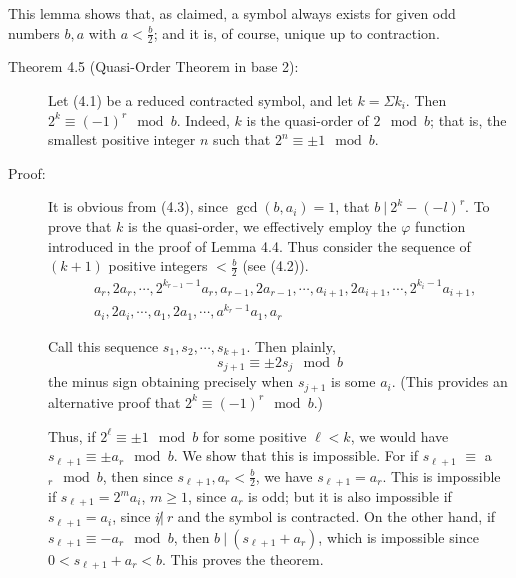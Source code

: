 This lemma shows that, as claimed, a symbol always exists for given odd numbers $b,a$ with $a < \frac{b}{2}$; and it is, of course, unique up to contraction.

\begin{description}

  \item[Theorem 4.5 (Quasi-Order Theorem in base 2):] Let (4.1) be a reduced contracted symbol, and let $k = \Sigma k_{i}$. Then $2^{k} \equiv (-1)^{r} \mod{b}$. Indeed, $k$ is the quasi-order of $2 \mod{b}$; that is, the smallest positive integer $n$ such that $2^{n} \equiv \pm 1 \mod{b}$.

  \item[Proof:] It is obvious from (4.3), since $\gcd(b,a_{i}) = 1$, that $b\ |\ 2^{k}-(-l)^{r}$. To prove that $k$ is the quasi-order, we effectively employ the $\varphi$ function introduced in the proof of Lemma 4.4. Thus consider the sequence of $(k+1)$ positive integers $< \frac{b}{2}$ (see (4.2)).
    \begin{align*}
    & a_{r}, 2a_{r}, \cdots, 2^{k_{r-1}-1} a_{r}, a_{r-1}, 2a_{r-1}, \cdots, a_{i+1}, 2a_{i+1}, \cdots, 2^{k_{i}-1} a_{i+1}, \\
    & a_{i}, 2a_{i}, \cdots, a_{1}, 2a_{1}, \cdots, a^{k_{r}-1} a_{1}, a_{r} 
    \end{align*}

    Call this sequence $s_{1}, s_{2}, \cdots, s_{k+1}$. Then plainly,
    \begin{equation*}
    s_{j+1} \equiv \pm 2s_{j} \mod{b}
    \end{equation*}
    the minus sign obtaining precisely when $s_{j+1}$ is some $a_{i}$. (This provides an alternative proof that $2^{k} \equiv (-1)^{r} \mod{b}$.) 

    Thus, if $2^{\ell} \equiv \pm 1 \mod{b}$ for some positive $\ell < k$, we would have $s_{\ell+1} \equiv \pm a_{r} \mod{b}$. We show that this is impossible. For if $s_{\ell+1}$ $\equiv$ a$_{r} \mod{b}$, then since $s_{\ell+1},a_{r} < \frac{b}{2}$, we have $s_{\ell+1} = a_{r}$. This is impossible if $s_{\ell+1} = 2^{m} a_{i}$, $m \geq 1$, since $a_{r}$ is odd; but it is also impossible if $s_{\ell+1} = a_{i}$, since $i \not|\ r$ and the symbol is contracted. On the other hand, if $s_{\ell+1} \equiv -a_{r} \mod{b}$, then $b\ |\ (s_{\ell+1} + a_{r})$, which is impossible since $0 < s_{\ell+1} + a_{r} < b$. This proves the theorem.

\end{description}

